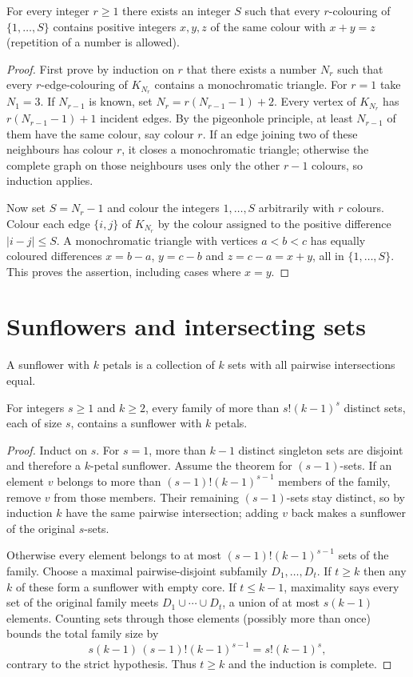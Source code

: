 \begin{theorem}[Schur]\label{thm:schur}
For every integer $r\ge1$ there exists an integer $S$ such that every $r$-colouring of $\{1,\ldots,S\}$ contains positive integers $x,y,z$ of the same colour with $x+y=z$ (repetition of a number is allowed).
\end{theorem}
\begin{proof}
First prove by induction on $r$ that there exists a number $N_r$ such that every $r$-edge-colouring of $K_{N_r}$ contains a monochromatic triangle. For $r=1$ take $N_1=3$. If $N_{r-1}$ is known, set $N_r=r(N_{r-1}-1)+2$. Every vertex of $K_{N_r}$ has $r(N_{r-1}-1)+1$ incident edges. By the pigeonhole principle, at least $N_{r-1}$ of them have the same colour, say colour $r$. If an edge joining two of these neighbours has colour $r$, it closes a monochromatic triangle; otherwise the complete graph on those neighbours uses only the other $r-1$ colours, so induction applies.

Now set $S=N_r-1$ and colour the integers $1,\ldots,S$ arbitrarily with $r$ colours. Colour each edge $\{i,j\}$ of $K_{N_r}$ by the colour assigned to the positive difference $|i-j|\le S$. A monochromatic triangle with vertices $a<b<c$ has equally coloured differences $x=b-a$, $y=c-b$ and $z=c-a=x+y$, all in $\{1,\ldots,S\}$. This proves the assertion, including cases where $x=y$.
\end{proof}

\section{Sunflowers and intersecting sets}

A sunflower with $k$ petals is a collection of $k$ sets with all pairwise intersections equal.

\begin{theorem}\label{thm:sunflower}
For integers $s\ge1$ and $k\ge2$, every family of more than $s!(k-1)^s$ distinct sets, each of size $s$, contains a sunflower with $k$ petals.
\end{theorem}
\begin{proof}
Induct on $s$. For $s=1$, more than $k-1$ distinct singleton sets are disjoint and therefore a $k$-petal sunflower. Assume the theorem for $(s-1)$-sets. If an element $v$ belongs to more than $(s-1)!(k-1)^{s-1}$ members of the family, remove $v$ from those members. Their remaining $(s-1)$-sets stay distinct, so by induction $k$ have the same pairwise intersection; adding $v$ back makes a sunflower of the original $s$-sets.

Otherwise every element belongs to at most $(s-1)!(k-1)^{s-1}$ sets of the family. Choose a maximal pairwise-disjoint subfamily $D_1,\ldots,D_t$. If $t\ge k$ then any $k$ of these form a sunflower with empty core. If $t\le k-1$, maximality says every set of the original family meets $D_1\cup\cdots\cup D_t$, a union of at most $s(k-1)$ elements. Counting sets through those elements (possibly more than once) bounds the total family size by
\[
 s(k-1)\,(s-1)!(k-1)^{s-1}=s!(k-1)^s,
\]
contrary to the strict hypothesis. Thus $t\ge k$ and the induction is complete.
\end{proof}

